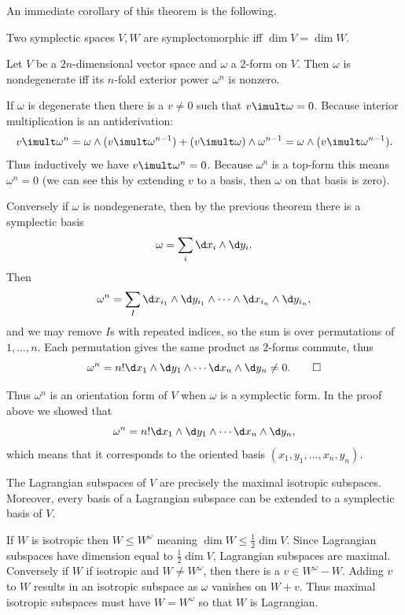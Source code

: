\eproof

An immediate corollary of this theorem is the following.

\bcoro[name={dimsympinvar}]

    Two symplectic spaces $V,W$ are symplectomorphic iff $\dim V=\dim W$.

\ecoro

\bcoro[name={ndextpower}]

    Let $V$ be a $2n$-dimensional vector space and $\omega$ a $2$-form on $V$.
    Then $\omega$ is nondegenerate iff its $n$-fold exterior power $\omega^n$ is nonzero.

\ecoro

\bproof

    If $\omega$ is degenerate then there is a $v\neq0$ such that $v\imult\omega=0$.
    Because interior multiplication is an antiderivation:
    $$ v\imult\omega^n = \omega\wedge(v\imult\omega^{n-1}) + (v\imult\omega)\wedge\omega^{n-1} = \omega\wedge(v\imult\omega^{n-1}) . $$
    Thus inductively we have $v\imult\omega^n=0$.
    Because $\omega^n$ is a top-form this means $\omega^n=0$ (we can see this by extending $v$ to a basis, then $\omega$ on that basis is zero).

    Conversely if $\omega$ is nondegenerate, then by the previous theorem there is a symplectic basis
    $$ \omega = \sum_i\d x_i\wedge\d y_i . $$
    Then
    $$ \omega^n = \sum_I\d x_{i_1}\wedge\d y_{i_1}\wedge\cdots\wedge\d x_{i_n}\wedge\d y_{i_n} , $$
    and we may remove $I$s with repeated indices, so the sum is over permutations of $1,\dots,n$.
    Each permutation gives the same product as $2$-forms commute, thus
    $$ \omega^n = n!\d x_1\wedge\d y_1\wedge\cdots\d x_n\wedge\d y_n \neq 0 . \qed $$

\eproof

Thus $\omega^n$ is an orientation form of $V$ when $\omega$ is a symplectic form.
In the proof above we showed that
$$ \omega^n = n!\d x_1\wedge\d y_1\wedge\cdots\d x_n\wedge\d y_n , $$
which means that it corresponds to the oriented basis $(x_1,y_1,\dots,x_n,y_n)$.

\bprop

    The Lagrangian subspaces of $V$ are precisely the maximal isotropic subspaces.
    Moreover, every basis of a Lagrangian subspace can be extended to a symplectic basis of $V$.

\eprop

\bproof

    If $W$ is isotropic then $W\leq W^\omega$ meaning $\dim W\leq\frac12\dim V$.
    Since Lagrangian subspaces have dimension equal to $\frac12\dim V$, Lagrangian subspaces are maximal.
    Conversely if $W$ if isotropic and $W\neq W^\omega$, then there is a $v\in W^\omega-W$.
    Adding $v$ to $W$ results in an isotropic subspace as $\omega$ vanishes on $W+v$.
    Thus maximal isotropic subspaces must have $W=W^\omega$ so that $W$ is Lagrangian.

